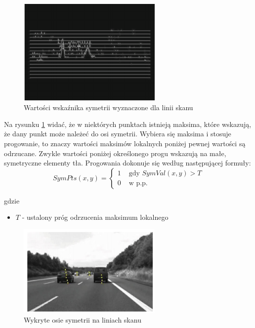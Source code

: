 \begin{figure}
  \centering
  \includegraphics[width=7cm]{img/tl_peaks.png}
  \caption{Wartości wskaźnika symetrii wyznaczone dla linii skanu\cite{T1}}
  \label{fig:car_scan_lines}
\end{figure}

Na rysunku \ref{fig:car_scan_lines} widać, że w niektórych punktach istnieją maksima, które wskazują, że dany punkt może należeć do osi symetrii. Wybiera się maksima i stosuje progowanie, to znaczy wartości maksimów lokalnych poniżej pewnej wartości są odrzucane. Zwykle wartości poniżej określonego progu wskazują na małe, symetryczne elementy tła. Progowania dokonuje się według następującej formuły:
\begin{equation}
SymPts(x,y)=\begin{cases}
1 & \text{ gdy } SymVal(x,y)>T\\ 
0 & \text{ w p.p.}
\end{cases}
\end{equation}

gdzie
\begin{itemize}
\item $T$ - ustalony próg odrzucenia maksimum lokalnego
\end{itemize}


\begin{figure}
  \centering
  \includegraphics[width=7cm]{img/car_symmetry.png}
  \caption{Wykryte osie symetrii na liniach skanu\cite{T1}}
  \label{fig:car_detected}
\end{figure}

